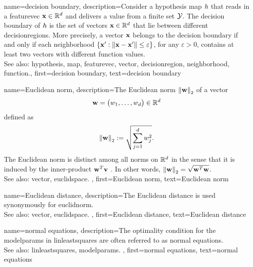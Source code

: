 {name={decision boundary}, 
	description={Consider a 
		\gls{hypothesis} \gls{map} $h$ that reads in a \gls{featurevec}  
		${\bf x} \in \mathbb{R}^{d}$ and delivers a value from a finite set $\mathcal{Y}$. 
		The decision boundary of $h$ is the set of \glspl{vector} ${\bf x} \in \mathbb{R}^{d}$ 
		that lie between different \glspl{decisionregion}. More precisely, a 
		\gls{vector} ${\bf x}$ belongs to the decision boundary if and only 
		if each \gls{neighborhood} $\{ {\bf x}': \| {\bf x} - {\bf x}' \| \leq \varepsilon \}$, 
		for any $\varepsilon >0$, contains at least two \glspl{vector} with different \gls{function} values.
				\\
		See also: \gls{hypothesis}, \gls{map}, \gls{featurevec}, \gls{vector}, \gls{decisionregion}, \gls{neighborhood}, \gls{function}.},
	first={decision boundary},
	text={decision boundary} 
}


{name={Euclidean norm}, 
	description={The 
		Euclidean norm $\normgeneric{\weights}{2}$ of a \gls{vector} 
		$${\bf w} = \big(w_{1},\ldots,w_{d} \big) \in
		\mathbb{R}^{d}$$
		defined as 
		$$\normgeneric{\weights}{2} \defeq \sqrt{\sum_{\featureidx=1}^{\nrfeatures}\weight^2_{\featureidx}}.$$ 
		The Euclidean norm is distinct among all norms on $\mathbb{R}^{d}$ in the sense 
		that it is induced by the inner-product ${\bf w}^{T} {\bf v}$ \cite{RudinBook,HalmosFiniteDimVecSpace,BoydConvexBook}. 
		In other words, $\normgeneric{\weights}{2}= \sqrt{\weights^{T} \weights}$.	\\
		See also: \gls{vector}, \gls{euclidspace}. },
	first={Euclidean norm},
	text={Euclidean norm} 
}

{name={Euclidean distance}, 
	description={The Euclidean distance is used 
	synonymously for \gls{euclidnorm}.	\\
	See also: \gls{vector}, \gls{euclidspace}. },
	first={Euclidean distance},
	text={Euclidean distance} 
}

{name={normal equations}, 
	description={The optimality condition for the \glspl{modelparam} 
	in \gls{linleastsquares} are often referred to as normal equations.\\ 
	See also: \gls{linleastsquares}, \glspl{modelparam}. 
	},
	first={normal equations},
	text={normal equations} 
}


